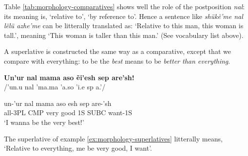 Table \ref{tab:morphology-comparatives} shows well the role of the postposition \emph{nal}:
its meaning is, ‘relative to’, ‘by reference to’.
Hence a sentence like \emph{shükẽ’me nal lëlü azhe’me} can be litterally translated as:
‘Relative to this man, this woman is tall.’, meaning ‘This woman is taller than this man.’ (See vocabulary list above).

A superlative is constructed the same way as a comparative, except that we compare with everything: to be the \emph{best} means to be \emph{better than everything}.

\begin{exe}
\ex\label{ex:morphology-superlatives}

\textbf{Un’ur nal mama aso ẽi’esh sep are’sh!}\\
/'un.u{\ipaR} nal 'ma.ma 'a.so '{\ipaET}i.e{\ipaS} s{\ipaE}p a.'{\ipaR\ipaE\ipaS}/

\gll un-’ur nal mama aso esh sep are-’sh\\
all-3PL CMP very good 1S SUBC want-1S\\
\trans ‘I wanna be the very best!’

\end{exe}

The superlative of example \ref{ex:morphology-superlatives} litterally means, ‘Relative to everything, me be very good, I want’.

